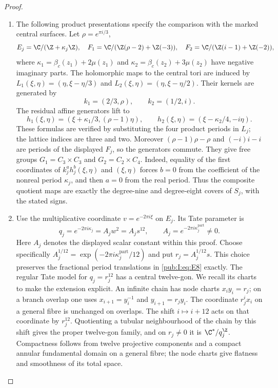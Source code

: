 \begin{proof}
\begin{enumerate}[label=\arabic*.,leftmargin=*]
\item The following product presentations specify the comparison
with the marked central surfaces. Let
$\rho=e^{\pi i/3}$,
\[
 E_j=\C/(\Z+\kappa_j\Z),\quad
 F_1=\C/(\Z(\rho-2)+\Z(-3)),\quad
 F_2=\C/(\Z(i-1)+\Z(-2)),
\]
where $\kappa_1=\beta_c(z_1)+2\mu(z_1)$ and
$\kappa_2=\beta_c(z_2)+3\mu(z_2)$ have negative imaginary parts.
The holomorphic maps to the central tori are induced by
$L_1(\xi,\eta)=(\eta,\xi-\eta/3)$ and
$L_2(\xi,\eta)=(\eta,\xi-\eta/2)$. Their kernels are generated by
\[
 k_1=(2/3,\rho),\qquad k_2=(1/2,i).
\]
The residual affine generators lift to
\begin{equation}
 h_1(\xi,\eta)=(\xi+\kappa_1/3,(\rho-1)\eta),\qquad
 h_2(\xi,\eta)=(\xi-\kappa_2/4,-i\eta).
\label{pub:I:eq:E8}
\end{equation}
These formulas are verified by substituting the four product periods
in $L_j$; the lattice indices are three and two. Moreover
$(\rho-1)\rho-\rho$ and $(-i)i-i$ are periods of the displayed
$F_j$, so the generators commute. They give free groups
$G_1=C_3\times C_3$ and $G_2=C_2\times C_4$. Indeed, equality of
the first coordinates of $k_j^a h_j^b(\xi,\eta)$ and $(\xi,\eta)$
forces $b=0$ from the coefficient of the nonreal period $\kappa_j$,
and then $a=0$ from the real period. Thus the composite quotient
maps are exactly the degree-nine and degree-eight covers of $S_j$,
with the stated signs.

\item Use the multiplicative coordinate $v=e^{-2\pi i\xi}$ on $E_j$.
Its Tate parameter is
\[
       q_j=e^{-2\pi i\kappa_j}=A_jw^2=A_js^{12},
       \qquad A_j=e^{-2\pi i\kappa_j^{\mathrm{part}}}\ne0.
\]
Here $A_j$ denotes the displayed scalar constant within this proof. Choose specifically
$A_j^{1/12}=\exp(-2\pi i\kappa_j^{\mathrm{part}}/12)$ and put
$r_j=A_j^{1/12}s$. This choice preserves the fractional period
translations in \eqref{pub:I:eq:E8} exactly. The regular Tate model for $q_j=r_j^{12}$
has a central twelve-gon. We recall its charts to make the extension
explicit. An infinite chain has node charts
$x_i y_i=r_j$; on a branch overlap one uses
$x_{i+1}=y_i^{-1}$ and $y_{i+1}=r_jy_i$. The coordinate
$r_j^i x_i$ on a general fibre is unchanged on overlaps.
The shift $i\mapsto i+12$ acts on that coordinate by $r_j^{12}$.
Quotienting a tubular neighbourhood of the chain by this shift gives
the proper twelve-gon family, and on $r_j\ne0$ it is
$\C^*/q_j^\Z$. Compactness follows from twelve projective components
and a compact annular fundamental domain on a general fibre;
the node charts give flatness and smoothness of its total space.


\end{enumerate}
\end{proof}

